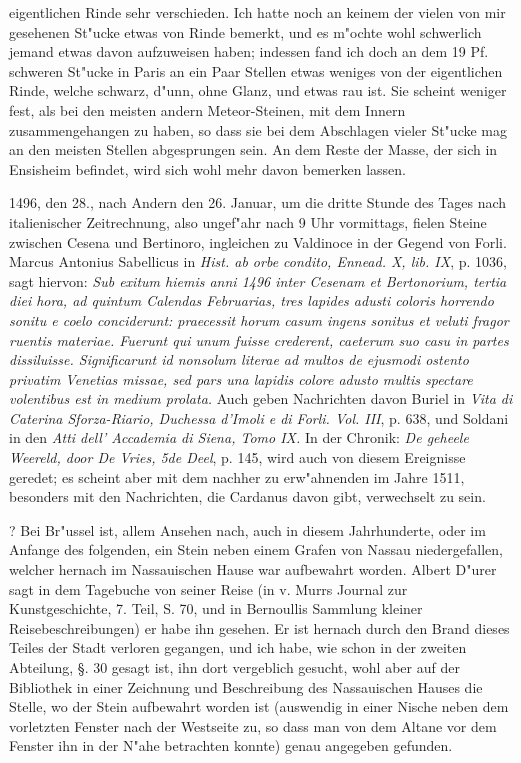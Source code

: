 \documentclass[a4paper, 11pt, oneside, polutonikogreek, german]{article}
\begin{document}
eigentlichen Rinde sehr verschieden. Ich hatte noch an keinem der vielen von mir gesehenen St"ucke etwas von Rinde bemerkt, und es m"ochte wohl schwerlich jemand etwas davon aufzuweisen haben; indessen fand ich doch an dem 19 Pf. schweren St"ucke in Paris an ein Paar Stellen etwas weniges von der eigentlichen Rinde, welche schwarz, d"unn, ohne Glanz, und etwas rau ist. Sie scheint weniger fest, als bei den meisten andern Meteor-Steinen, mit dem Innern zusammengehangen zu haben, so dass sie bei dem Abschlagen vieler St"ucke mag an den meisten Stellen abgesprungen sein. An dem Reste der Masse, der sich in Ensisheim befindet, wird sich wohl mehr davon bemerken lassen.

1496, den 28., nach Andern den 26. Januar, um die dritte Stunde des Tages nach italienischer Zeitrechnung, also ungef"ahr nach 9 Uhr vormittags, fielen Steine zwischen Cesena und Bertinoro, ingleichen zu Valdinoce in der Gegend von Forli. Marcus Antonius Sabellicus in \emph{Hist. ab orbe condito, Ennead. X, lib. IX}, p. 1036, sagt hiervon: \emph{Sub exitum hiemis anni 1496 inter Cesenam et Bertonorium, tertia diei hora, ad quintum Calendas Februarias, tres lapides adusti coloris horrendo sonitu e coelo conciderunt: praecessit horum casum ingens sonitus et veluti fragor ruentis materiae. Fuerunt qui unum fuisse crederent, caeterum suo casu in partes dissiluisse. Significarunt id nonsolum literae ad multos de ejusmodi ostento privatim Venetias missae, sed pars una lapidis colore adusto multis spectare volentibus est in medium prolata.} Auch geben Nachrichten davon Buriel in \emph{Vita di Caterina Sforza-Riario, Duchessa d'Imoli e di Forli. Vol. III}, p. 638, und Soldani in den \emph{Atti dell' Accademia di Siena, Tomo IX.} In der Chronik: \emph{De geheele Weereld, door De Vries, 5de Deel}, p. 145, wird auch von diesem Ereignisse geredet; es scheint aber mit dem nachher zu erw"ahnenden im Jahre 1511, besonders mit den Nachrichten, die Cardanus davon gibt, verwechselt zu sein.

? Bei Br"ussel ist, allem Ansehen nach, auch in diesem Jahrhunderte, oder im Anfange des folgenden, ein Stein neben einem Grafen von Nassau niedergefallen, welcher hernach im Nassauischen Hause war aufbewahrt worden. Albert D"urer sagt in dem Tagebuche von seiner Reise (in v. Murrs Journal zur Kunstgeschichte, 7. Teil, S. 70, und in Bernoullis Sammlung kleiner Reisebeschreibungen) er habe ihn gesehen. Er ist hernach durch den Brand dieses Teiles der Stadt verloren gegangen, und ich habe, wie schon in der zweiten Abteilung, §. 30 gesagt ist, ihn dort vergeblich gesucht, wohl aber auf der Bibliothek in einer Zeichnung und Beschreibung des Nassauischen Hauses die Stelle, wo der Stein aufbewahrt worden ist (auswendig in einer Nische neben dem vorletzten Fenster nach der Westseite zu, so dass man von dem Altane vor dem Fenster ihn in der N"ahe betrachten konnte) genau angegeben gefunden.
\end{document}
